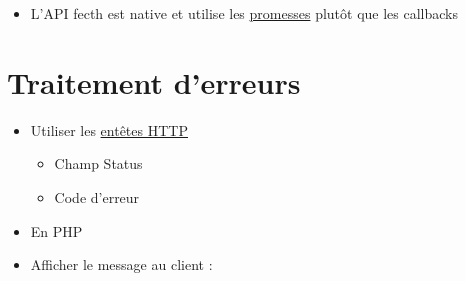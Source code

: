 \begin{itemize}
\tightlist
\item
  L'API fecth est native et utilise les
  \href{https://www.promisejs.org/}{promesses} plutôt que les callbacks
\end{itemize}

\hypertarget{traitement-derreurs}{%
\section{Traitement d'erreurs}\label{traitement-derreurs}}

\begin{itemize}
\tightlist
\item
  Utiliser les
  \href{https://www.bennadel.com/blog/1860-using-appropriate-status-codes-with-each-api-response.htm}{entêtes
  HTTP}

  \begin{itemize}
  \tightlist
  \item
    Champ Status
  \item
    Code d'erreur
  \end{itemize}
\item
  En PHP
\end{itemize}

\begin{otherlanguage}{english}

\begin{Shaded}
\begin{Highlighting}[]
\OtherTok{(}\OtherTok{,} \OtherTok{,} \OtherTok{);}
\end{Highlighting}
\end{Shaded}

\end{otherlanguage}

\begin{itemize}
\tightlist
\item
  Afficher le message au client :
\end{itemize}

\begin{otherlanguage}{english}

\begin{Shaded}
\begin{Highlighting}[]
\NormalTok{(}\NormalTok{)}\OperatorTok{;}
\end{Highlighting}
\end{Shaded}

\end{otherlanguage}

